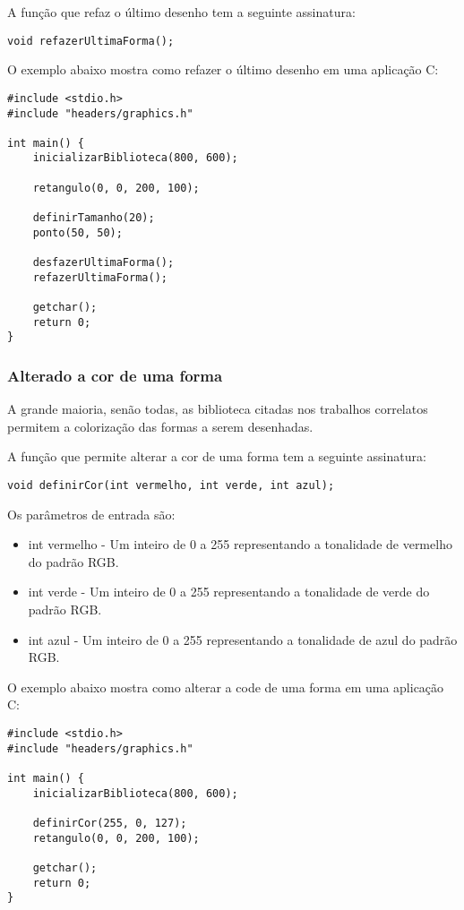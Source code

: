 \documentclass[12pt, %
openright,
oneside, %
a4paper,    %
brazil]{facom-ufu-abntex2}
\begin{document}
A função que refaz o último desenho tem a seguinte assinatura:

\begin{lstlisting}
void refazerUltimaForma();
\end{lstlisting}

O exemplo abaixo mostra como refazer o último desenho em uma aplicação C:

\begin{lstlisting}
#include <stdio.h>
#include "headers/graphics.h"

int main() {
    inicializarBiblioteca(800, 600);

    retangulo(0, 0, 200, 100);
    
    definirTamanho(20);
    ponto(50, 50);

    desfazerUltimaForma();
    refazerUltimaForma();

    getchar();
    return 0;
}
\end{lstlisting}

\subsubsection{Alterado a cor de uma forma}
A grande maioria, senão todas, as biblioteca citadas nos trabalhos correlatos permitem a colorização das formas a serem desenhadas.

A função que permite alterar a cor de uma forma tem a seguinte assinatura:

\begin{lstlisting}
void definirCor(int vermelho, int verde, int azul);
\end{lstlisting}

Os parâmetros de entrada são:

\begin{itemize}
    \item int vermelho - Um inteiro de 0 a 255 representando a tonalidade de vermelho do padrão RGB.
    \item int verde - Um inteiro de 0 a 255 representando a tonalidade de verde do padrão RGB.
    \item int azul - Um inteiro de 0 a 255 representando a tonalidade de azul do padrão RGB.
\end{itemize}

O exemplo abaixo mostra como alterar a code de uma forma em uma aplicação C:

\begin{lstlisting}
#include <stdio.h>
#include "headers/graphics.h"

int main() {
    inicializarBiblioteca(800, 600);

    definirCor(255, 0, 127);
    retangulo(0, 0, 200, 100);

    getchar();
    return 0;
}
\end{lstlisting}
\end{document}
